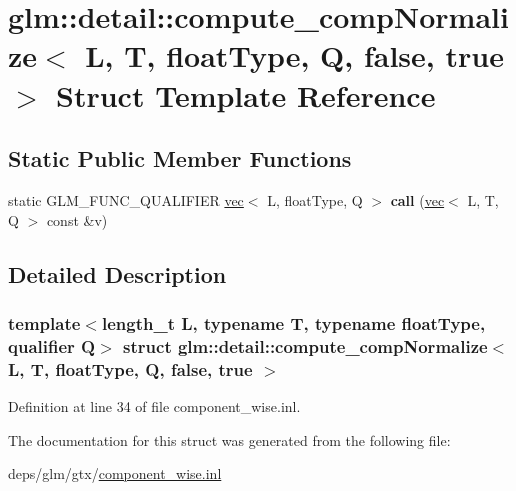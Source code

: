 \hypertarget{structglm_1_1detail_1_1compute__compNormalize_3_01L_00_01T_00_01floatType_00_01Q_00_01false_00_01true_01_4}{}\section{glm\+:\+:detail\+:\+:compute\+\_\+comp\+Normalize$<$ L, T, float\+Type, Q, false, true $>$ Struct Template Reference}
\label{structglm_1_1detail_1_1compute__compNormalize_3_01L_00_01T_00_01floatType_00_01Q_00_01false_00_01true_01_4}
\subsection*{Static Public Member Functions}
\begin{DoxyCompactItemize}
\item 
\mbox{\label{structglm_1_1detail_1_1compute__compNormalize_3_01L_00_01T_00_01floatType_00_01Q_00_01false_00_01true_01_4_ac4106152eca812bf0f16045bfccdb3d6}} 
static G\+L\+M\+\_\+\+F\+U\+N\+C\+\_\+\+Q\+U\+A\+L\+I\+F\+I\+ER \hyperlink{structglm_1_1vec}{vec}$<$ L, float\+Type, Q $>$ {\bfseries call} (\hyperlink{structglm_1_1vec}{vec}$<$ L, T, Q $>$ const \&v)
\end{DoxyCompactItemize}


\subsection{Detailed Description}
\subsubsection*{template$<$length\+\_\+t L, typename T, typename float\+Type, qualifier Q$>$\newline
struct glm\+::detail\+::compute\+\_\+comp\+Normalize$<$ L, T, float\+Type, Q, false, true $>$}



Definition at line 34 of file component\+\_\+wise.\+inl.



The documentation for this struct was generated from the following file\+:\begin{DoxyCompactItemize}
\item 
deps/glm/gtx/\hyperlink{component__wise_8inl}{component\+\_\+wise.\+inl}\end{DoxyCompactItemize}
